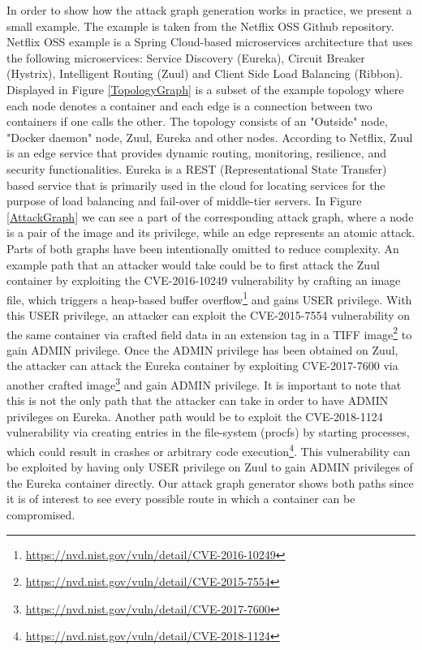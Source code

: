 In order to show how the attack graph generation works in practice, we present a small example. The example is taken from the Netflix OSS Github repository. Netflix OSS example is a Spring Cloud-based microservices architecture that uses the following microservices: Service Discovery (Eureka), Circuit Breaker (Hystrix), Intelligent Routing (Zuul) and Client Side Load Balancing (Ribbon). Displayed in Figure \ref{TopologyGraph} is a subset of the example topology where each node denotes a container and each edge is a connection between two containers if one calls the other. The topology consists of an "Outside" node, "Docker daemon" node, Zuul, Eureka and other nodes. According to Netflix, Zuul is an edge service that provides dynamic routing, monitoring, resilience, and security functionalities. Eureka is a REST (Representational State Transfer) based service that is primarily used in the cloud for locating services for the purpose of load balancing and fail-over of middle-tier servers. In Figure \ref{AttackGraph} we can see a part of the corresponding attack graph, where a node is a pair of the image and its privilege, while an edge represents an atomic attack. Parts of both graphs have been intentionally omitted to reduce complexity. An example path that an attacker would take could be to first attack the Zuul container by exploiting the CVE-2016-10249 vulnerability by crafting an image file, which triggers a heap-based buffer overflow\footnote{\url{https://nvd.nist.gov/vuln/detail/CVE-2016-10249}} and gains USER privilege.  With this USER privilege, an attacker can exploit the CVE-2015-7554 vulnerability on the same container via crafted field data in an extension tag in a TIFF image\footnote{\url{https://nvd.nist.gov/vuln/detail/CVE-2015-7554}} to gain ADMIN privilege. Once the ADMIN privilege has been obtained on Zuul, the attacker can attack the Eureka container by exploiting CVE-2017-7600 via another crafted image\footnote{\url{https://nvd.nist.gov/vuln/detail/CVE-2017-7600}} and gain ADMIN privilege. It is important to note that this is not the only path that the attacker can take in order to have ADMIN privileges on Eureka. Another path would be to exploit the CVE-2018-1124 vulnerability via creating entries in the file-system (procfs) by starting processes, which could result in crashes or arbitrary code execution\footnote{\url{https://nvd.nist.gov/vuln/detail/CVE-2018-1124}}. This vulnerability can be exploited by having only USER privilege on Zuul to gain ADMIN privileges of the Eureka container directly. Our attack graph generator shows both paths since it is of  interest to see every possible route in which a container can be compromised.




